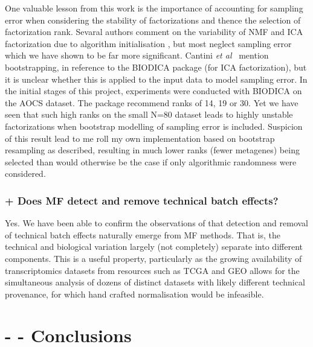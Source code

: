 \documentclass[tikz, 11pt,a4paper,oneside,fleqn, draft]{article}
\newcommand{\etal}{{\em et al\/}}
\begin{document}
One valuable lesson from this work is the importance of accounting for sampling error  when considering the stability of factorizations and thence the selection of factorization rank.    Sevaral authors comment on the variability of NMF and ICA factorization due to algorithm initialisation \cite{Kairov2017,Sompairac2019,WayGregory2019}, but most neglect sampling error which we have shown to be far more significant.   Cantini \etal\ \cite{Cantini2019a} mention bootstrapping, in reference to the BIODICA package (for ICA factorization), but it is unclear whether this is applied to the input data to model sampling error.  In the initial stages of this project, experiments were conducted with BIODICA on the AOCS dataset.   The package recommend ranks of 14, 19 or 30.  Yet we have seen that such high ranks on the small N=80 dataset leads to highly unstable factorizations when bootstrap modelling of sampling error is included.  Suspicion of this result lead to me roll my own implementation based on bootstrap resampling as described, resulting in much lower ranks (fewer metagenes) being selected than would otherwise be the case if only algorithmic randomness were considered.

\subsubsection*{+ Does MF detect and remove technical batch effects?}

Yes. We have been able to confirm the observations of \cite{Zhou2018a,Renard2016,Meng2016} that detection and removal of technical  batch effects naturally emerge from MF methods.  That is, the technical and biological variation largely (not completely) separate into different components.  This is a useful property, particularly as the growing availability of transcriptomics datasets from resources such as TCGA and GEO allows for the simultaneous analysis of dozens of distinct datasets with likely different technical provenance, for which hand crafted normalisation would be infeasible.





\clearpage

\section{- - Conclusions}
\end{document}
